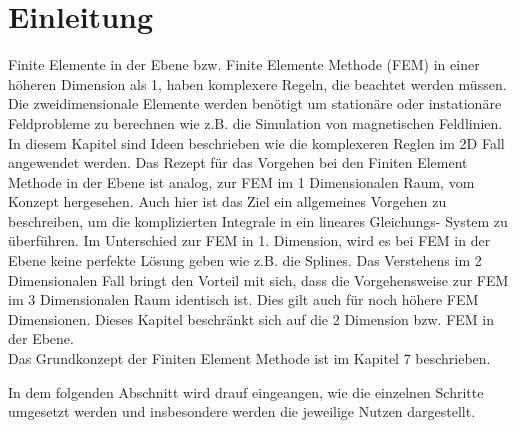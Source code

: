 %
%
%
\section{Einleitung\label{fem:section:einleitung}}
Finite Elemente in der Ebene bzw. Finite Elemente Methode (FEM) in einer höheren Dimension als 1, haben komplexere Regeln, die beachtet werden müssen. Die zweidimensionale Elemente werden benötigt um stationäre oder instationäre Feldprobleme zu berechnen wie z.B. die Simulation von magnetischen Feldlinien. In diesem Kapitel sind Ideen beschrieben wie die komplexeren Reglen im 2D Fall angewendet werden. Das Rezept für das Vorgehen bei den Finiten Element Methode in der Ebene ist analog, zur FEM im 1 Dimensionalen Raum, vom Konzept hergesehen. Auch hier ist das Ziel ein allgemeines Vorgehen zu beschreiben, um die komplizierten Integrale in ein lineares Gleichungs- System zu überführen. Im Unterschied zur FEM in 1. Dimension, wird es bei FEM in der Ebene keine perfekte Lösung geben wie z.B. die Splines. Das Verstehens im 2 Dimensionalen Fall bringt den Vorteil mit sich, dass die Vorgehensweise zur FEM im 3 Dimensionalen Raum identisch ist. Dies gilt auch für noch höhere FEM Dimensionen. Dieses  Kapitel beschränkt sich auf die 2 Dimension bzw. FEM in der Ebene. \\
Das Grundkonzept der Finiten Element Methode ist im Kapitel 7 beschrieben.

In dem folgenden Abschnitt wird drauf eingeangen, wie die einzelnen Schritte umgesetzt werden und insbesondere werden die jeweilige Nutzen dargestellt.

